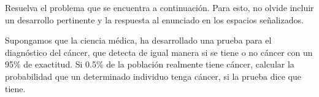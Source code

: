 \documentclass{cdplf-prueba}
\begin{document}
%
\begin{tcbraster}[enhanced,raster columns=3,raster width=\linewidth,raster column skip=3pt,raster force size=false]
    \begin{caja}[title={\sffamily\scshape\bfseries Nombre},height=30pt,add to width=4cm]
    \end{caja}
    \begin{caja}[title={\sffamily\scshape\bfseries Puntaje},height=30pt,add to width=-2cm]
    \end{caja}
    \begin{caja}[title={\sffamily\scshape\bfseries Nota},height=30pt,add to width=-2cm]
    \end{caja}                    
\end{tcbraster}
%
\vspace*{10pt}
\begin{tcolorbox}[boxrule=1pt,colback=white,leftrule=3mm]
    \raggedright Resuelva el problema que se encuentra a continuación. Para esto, no olvide 
    incluir un desarrollo pertinente y la respuesta al enunciado en los espacios señalizados.        
\end{tcolorbox}
%
Supongamos que la ciencia médica, ha desarrollado una prueba para 
el diagnóstico del cáncer, que detecta de igual manera si se tiene o no 
cáncer con un 95\% de exactitud. Si 0.5\% de la población
realmente tiene cáncer, calcular la probabilidad que un determinado individuo tenga
cáncer, si la prueba dice que tiene.

\begin{desarrollo}[height=14cm]
\end{desarrollo}
\begin{respuesta}[height=1.5cm]
\end{respuesta}
\end{document}
